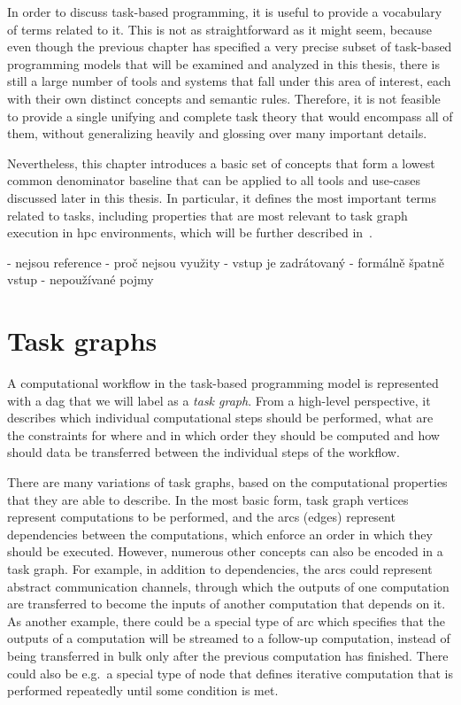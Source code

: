 In order to discuss task-based programming, it is useful to provide a vocabulary of terms related
to it. This is not as straightforward as it might seem, because even though the previous chapter
has specified a very precise subset of task-based programming models that will be examined and
analyzed in this thesis, there is still a large number of tools and systems that fall under this
area of interest, each with their own distinct concepts and semantic rules. Therefore, it is not
feasible to provide a single unifying and complete task theory that would encompass all of them,
without generalizing heavily and glossing over many important details.

Nevertheless, this chapter introduces a basic set of concepts that form a lowest common denominator
baseline that can be applied to all tools and use-cases discussed later in this thesis. In
particular, it defines the most important terms related to tasks, including properties that are
most relevant to task graph execution in \gls{hpc} environments, which will be further
described in~.

- nejsou reference
	- proč nejsou využity
- vstup je zadrátovaný
- formálně špatně vstup
- nepoužívané pojmy

\section{Task graphs}
A computational workflow in the task-based programming model is represented with a
\gls{dag} that we will label as a \emph{task graph}. From a high-level
perspective, it describes which individual computational steps should be performed, what are the
constraints for where and in which order they should be computed and how should data be transferred
between the individual steps of the workflow.

There are many variations of task graphs, based on the computational properties that they are able
to describe. In the most basic form, task graph vertices represent computations to be performed,
and the arcs (edges) represent dependencies between the computations, which enforce an order in
which they should be executed. However, numerous other concepts can also be encoded in a task
graph. For example, in addition to dependencies, the arcs could represent abstract communication
channels, through which the outputs of one computation are transferred to become the inputs of
another computation that depends on it. As another example, there could be a special type of arc
which specifies that the outputs of a computation will be streamed to a follow-up computation,
instead of being transferred in bulk only after the previous computation has finished. There could
also be e.g.\ a special type of node that defines iterative computation that is performed
repeatedly until some condition is met.

